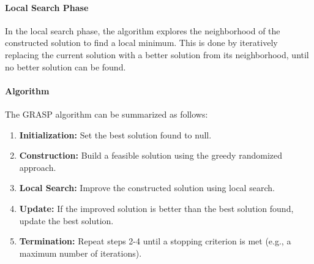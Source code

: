 \documentclass{article}
\begin{document}
\paragraph{Local Search Phase}
In the local search phase, the algorithm explores the neighborhood of the constructed solution to find a local minimum.
This is done by iteratively replacing the current solution with a better solution from its neighborhood,
until no better solution can be found.

\paragraph{Algorithm}
The GRASP algorithm can be summarized as follows:
\begin{enumerate}
	\item \textbf{Initialization:} Set the best solution found to null.
	\item \textbf{Construction:} Build a feasible solution using the greedy randomized approach.
	\item \textbf{Local Search:} Improve the constructed solution using local search.
	\item \textbf{Update:} If the improved solution is better than the best solution found, update the best solution.
	\item \textbf{Termination:} Repeat steps 2-4 until a stopping criterion is met (e.g., a maximum number of iterations).
\end{enumerate}
\end{document}

